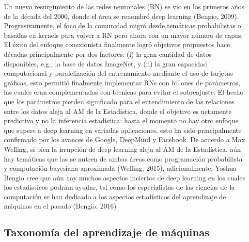 Un nuevo resurgimiento de las redes neuronales (RN) se vio en los primeros años de la década del 2000, donde el área se renombró deep learning (Bengio, 2009). Progresivamente, el foco de la comunidad migró desde temáticas probabilistas o basadas en kernels para volver a RN pero ahora con un mayor número de capas. El éxito del enfoque conexionista finalmente logró objetivos propuestos hace décadas principalmente por dos factores: (i) la gran cantidad de datos disponibles, e.g., la base de datos ImageNet, y (ii) la gran capacidad computacional y paralelización del entrenamiento mediante el uso de tarjetas gráficas, esto permitió finalmente implementar RNs con billones de parámetros, las cuales eran complementadas con técnicas para evitar el sobreajuste. El hecho que los parámetros pierden significado para el entendimiento de las relaciones entre los datos aleja al AM de la Estadística, donde el objetivo es netamente predictivo y no la inferencia estadística: hasta el momento no hay otro enfoque que supere a deep learning en variadas aplicaciones, esto ha sido principalmente confirmado por los avances de Google, DeepMind y Facebook. De acuerdo a Max Welling, si bien la irrupción de deep learning aleja al AM de la Estadística, aún hay temáticas que las se nutren de ambas áreas como programación probabilista y computación bayesiana aproximada (Welling, 2015), adicionalmente, Yoshua Bengio cree que aún hay muchos aspectos inciertos de deep learning en los cuales los estadísticos podrían ayudar, tal como los especialistas de las ciencias de la computación se han dedicado a los aspectos estadísticos del aprendizaje de máquinas en el pasado (Bengio, 2016) 


\subsection{Taxonomía del aprendizaje de máquinas}

